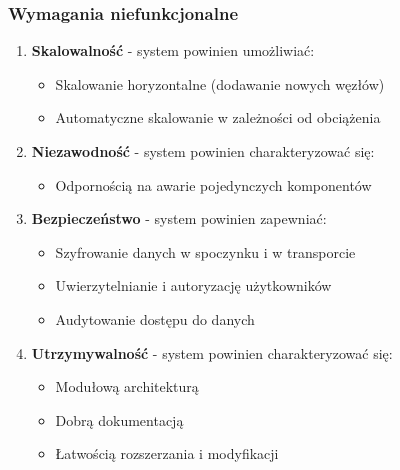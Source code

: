 \subsubsection{Wymagania niefunkcjonalne}
\label{subsubsec:wymagania_niefunkcjonalne}

\begin{enumerate}
    
    \item \textbf{Skalowalność} - system powinien umożliwiać:
    \begin{itemize}
        \item Skalowanie horyzontalne (dodawanie nowych węzłów)
        \item Automatyczne skalowanie w zależności od obciążenia
    \end{itemize}
    
    \item \textbf{Niezawodność} - system powinien charakteryzować się:
    \begin{itemize}
        \item Odpornością na awarie pojedynczych komponentów
    \end{itemize}
    
    \item \textbf{Bezpieczeństwo} - system powinien zapewniać:
    \begin{itemize}
        \item Szyfrowanie danych w spoczynku i w transporcie
        \item Uwierzytelnianie i autoryzację użytkowników
        \item Audytowanie dostępu do danych
    \end{itemize}
    
    \item \textbf{Utrzymywalność} - system powinien charakteryzować się:
    \begin{itemize}
        \item Modułową architekturą
        \item Dobrą dokumentacją
        \item Łatwością rozszerzania i modyfikacji
    \end{itemize}
\end{enumerate}

